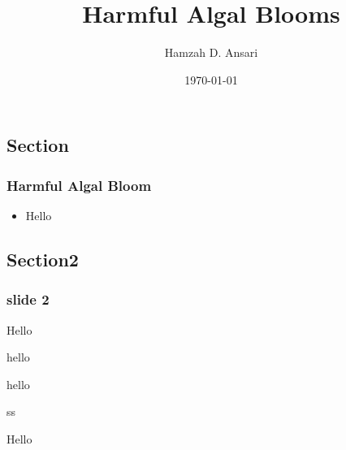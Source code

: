 \documentclass{beamer}
\title{Harmful Algal Blooms}
\author{Hamzah D. Ansari}
\institute{Oakland University}
\date{\today}
\begin{document}
\begin{frame} 
\titlepage
\end{frame}

\begin{frame}
	\section{Section}
	\frametitle{Harmful Algal Bloom}
\begin{itemize}
\item{Hello}
\end{itemize}	
\end{frame}

\begin{frame} 
	\section{Section2}
	\frametitle{slide 2}
Hello
\end{frame}


\begin{item}
\item{hello}
\item{hello}
\item{ss}
\end{item}
 
Hello
\end{document}
